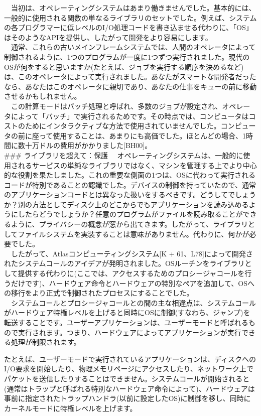 　当初は、オペレーティングシステムはあまり働きませんでした。基本的には、一般的に使用される関数の単なるライブラリのセットでした。例えば、システムの各プログラマーに低レベルのI/O処理コードを書き込ませる代わりに、「OS」はそのようなAPIを提供し、したがって開発をより容易にします。\\
　通常、これらの古いメインフレームシステムでは、人間のオペレータによって制御されるように、1つのプログラムが一度に1つずつ実行されました。現代のOSが何をすると思いますか(たとえば、ジョブを実行する順序を決めるなど)は、このオペレータによって実行されました。あなたがスマートな開発者だったなら、あなたはこのオペレータに親切であり、あなたの仕事をキューの前に移動させるかもしれません。\\
　この計算モードはバッチ処理と呼ばれ、多数のジョブが設定され、オペレータによって「バッチ」で実行されるためです。その時点では、コンピュータはコストのためにインタラクティブな方法で使用されていませんでした。コンピュータの前に座って使用することは、あまりにも高価でした。ほとんどの場合、1時間に数十万ドルの費用がかかりました{[}BH00{]}。\\
\#\#\# ライブラリを超えて：保護
　オペレーティングシステムは、一般的に使用されるサービスの単純なライブラリではなく、マシンを管理する上でより中心的な役割を果たしました。これの重要な側面の1つは、OSに代わって実行されるコードが特別であることの認識でした。デバイスの制御を持っていたので、通常のアプリケーションコードとは異なった扱いをするべきです。どうしてでしょうか？別の方法としてディスク上のどこからでもアプリケーションを読み込めるようにしたらどうでしょうか？任意のプログラムがファイルを読み取ることができるように、プライバシーの概念が窓から出てきます。したがって、ライブラリとしてファイルシステムを実装することは意味がありません。代わりに、何かが必要でした。\\
　したがって、Atlasコンピューティングシステム{[}K +
61、L78{]}によって開発されたシステムコールのアイデアが発明されました。OSルーチンをライブラリとして提供する代わりに(ここでは、アクセスするためのプロシージャコールを行うだけです)、ハードウェア命令とハードウェアの特別なペアを追加して、OSへの移行をより正式で制御されたプロセスにすることでした。\\
　システムコールとプロシージャコールとの間の主な相違点は、システムコールがハードウェア特権レベルを上げると同時にOSに制御(すなわち、ジャンプ)を転送することです。ユーザーアプリケーションは、ユーザーモードと呼ばれるもので実行されます。つまり、ハードウェアによってアプリケーションが実行できる処理が制限されます。

たとえば、ユーザーモードで実行されているアプリケーションは、ディスクへのI/O要求を開始したり、物理メモリページにアクセスしたり、ネットワーク上でパケットを送信したりすることはできません。システムコールが開始されると(通常はトラップと呼ばれる特別なハードウェア命令によって)、ハードウェアは事前に指定されたトラップハンドラ(以前に設定したOS)に制御を移し、同時にカーネルモードに特権レベルを上げます。

